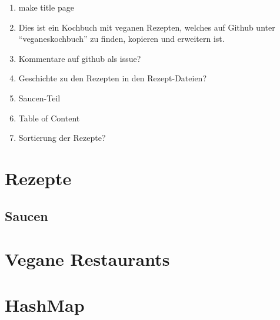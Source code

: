 \documentclass[12pt,a4paper]{article}
\begin{document}
\begin{enumerate}
	\item make title page
	\item Dies ist ein Kochbuch mit veganen Rezepten, welches auf Github unter \enquote{veganeskochbuch} zu finden, kopieren und erweitern ist.\\
	\item Kommentare auf github als issue?
	\item Geschichte zu den Rezepten in den Rezept-Dateien?
	\item Saucen-Teil
	\item Table of Content
	\item Sortierung der Rezepte?
\end{enumerate}
\clearpage
\section{Rezepte}
	
	
	
	
	
\subsection[Saucen]{Saucen}
    
    
	
\section{Vegane Restaurants}
	
	
\section{HashMap}
	
\end{document}
